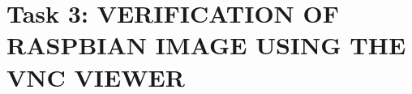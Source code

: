 \documentclass[15pt, a4paper, oneside]{report}
\begin{document}
\normalfont

\vspace*{5mm}

\section*{\Large Task 3: VERIFICATION OF RASPBIAN IMAGE USING THE VNC VIEWER}

\vspace{2mm}
    \Large
   
    
    
    
    
    

  
\vspace{1cm}
\end{document}
